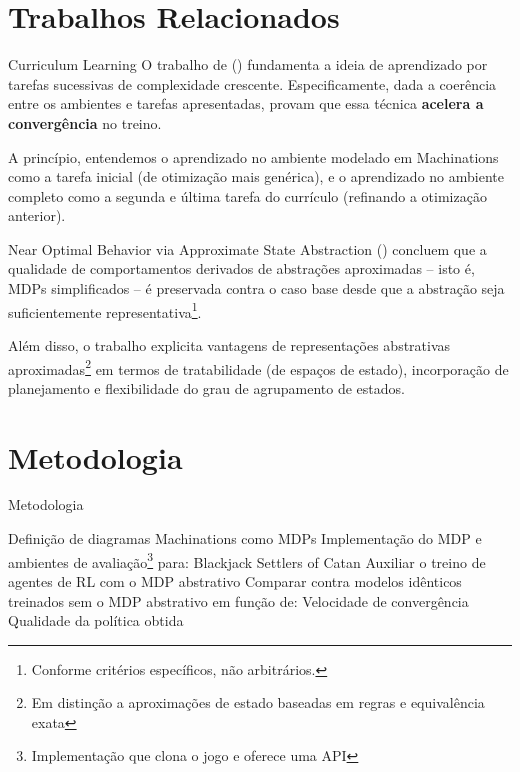 \documentclass[aspectratio=169]{beamer}
\begin{document}
\section{Trabalhos Relacionados}
\begin{frame}{Curriculum Learning}
    O trabalho de \citeauthor{curriculum-learning} (\citeyear{curriculum-learning}) fundamenta a ideia de aprendizado por tarefas sucessivas de complexidade crescente. Especificamente, dada a coerência entre os ambientes e tarefas apresentadas, \citeauthor{curriculum-learning} provam que essa técnica \textbf{acelera a convergência} no treino.

    A princípio, entendemos o aprendizado no ambiente modelado em Machinations como a tarefa inicial (de otimização mais genérica), e o aprendizado no ambiente completo como a segunda e última tarefa do currículo (refinando a otimização anterior).
\end{frame}
\begin{frame}{Near Optimal Behavior via Approximate State Abstraction}
    \citeauthor{approximate-state-abstraction} (\citeyear{approximate-state-abstraction}) concluem que a qualidade de comportamentos derivados de abstrações aproximadas -- isto é, MDPs simplificados -- é preservada contra o caso base desde que a abstração seja suficientemente representativa\footnote{Conforme critérios específicos, não arbitrários.}.

    Além disso, o trabalho explicita vantagens de representações abstrativas aproximadas\footnote{Em distinção a aproximações de estado baseadas em regras e equivalência exata} em termos de tratabilidade (de espaços de estado), incorporação de planejamento e flexibilidade do grau de agrupamento de estados.
\end{frame}


\section{Metodologia}

\begin{frame}{Metodologia}
    \begin{outline}[enumerate]
	\1 Definição de diagramas Machinations como MDPs
	\1 Implementação do MDP e ambientes de avaliação\footnote{Implementação que clona o jogo e oferece uma API} para:
            \2 Blackjack
            \2 Settlers of Catan
	\1 Auxiliar o treino de agentes de RL com o MDP abstrativo
	\1 Comparar contra modelos idênticos treinados sem o MDP abstrativo em função de:
	    \2 Velocidade de convergência
	    \2 Qualidade da política obtida
    \end{outline}
\end{frame}
\end{document}
